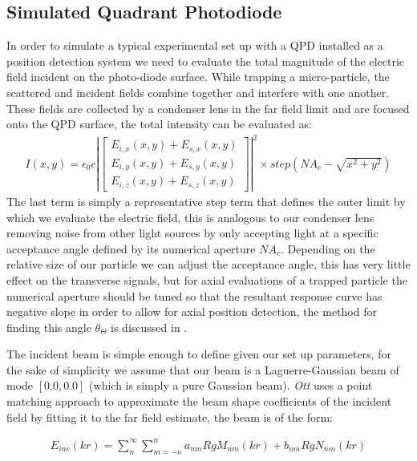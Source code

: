 \subsection{Simulated Quadrant Photodiode}
In order to simulate a typical experimental set up with a QPD installed as a position detection system we need to evaluate the total magnitude of the electric field incident on the photo-diode surface. While trapping a micro-particle, the scattered and incident fields combine together and interfere with one another. These fields are collected by a condenser lens in the far field limit and are focused onto the QPD surface, the total intensity can be evaluated as:
\begin{align}
I(x,y) = \epsilon_0c\left|
\begin{bmatrix} 
	E_{i,x}(x,y)+E_{s,x}(x,y) \\ 
	E_{i,y}(x,y)+E_{s,y}(x,y) \\ 
	E_{i,z}(x,y)+E_{s,z}(x,y)
\end{bmatrix} \right|^2 \times step(NA_c-\sqrt{x^2+y^2})
\end{align}
The last term is simply a representative step term that defines the outer limit by which we evaluate the electric field, this is analogous to our condenser lens removing noise from other light sources by only accepting light at a specific acceptance angle defined by its numerical aperture $NA_c$. Depending on the relative size of our particle we can adjust the acceptance angle, this has very little effect on the transverse signals, but for axial evaluations of a trapped particle the numerical aperture should be tuned so that the resultant response curve has negative slope in order to allow for axial position detection, the method for finding this angle $\theta_\Theta$ is discussed in \cite{Friedrich2012}.

The incident beam is simple enough to define given our set up parameters, for the sake of simplicity we assume that our beam is a Laguerre-Gaussian beam of mode $[0.0, 0.0]$ (which is simply a pure Gaussian beam). \textit{Ott} uses a point matching approach to approximate the beam shape coefficients of the incident field by fitting it to the far field estimate, the beam is of the form:

\begin{align}
	E_{inc}(kr)=\sum^\infty_n\sum^n_{m=-n}a_{mn}RgM_{nm}(kr)+b_{nm}RgN_{nm}(kr)
\end{align}

